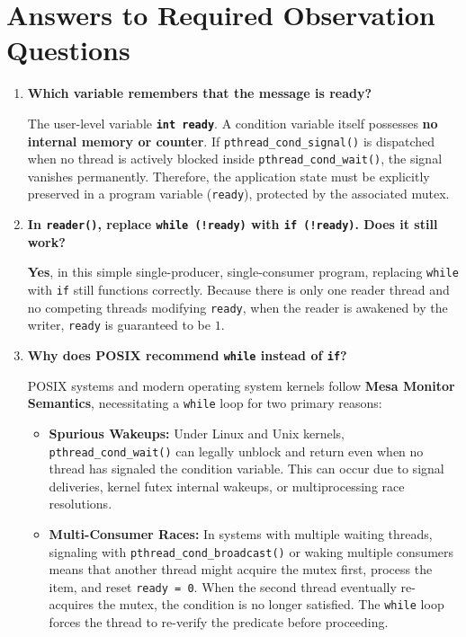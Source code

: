 \documentclass[12pt,a4paper]{report}
\numberwithin{equation}{chapter}
\numberwithin{figure}{chapter}
\numberwithin{table}{chapter}
\begin{document}
\section{Answers to Required Observation Questions}
\begin{enumerate}
    \item \textbf{Which variable remembers that the message is ready?}
    
    The user-level variable \textbf{\texttt{int ready}}.
    A condition variable itself possesses \textbf{no internal memory or counter}. If \texttt{pthread\_cond\_signal()} is dispatched when no thread is actively blocked inside \texttt{pthread\_cond\_wait()}, the signal vanishes permanently. Therefore, the application state must be explicitly preserved in a program variable (\texttt{ready}), protected by the associated mutex.

    \item \textbf{In \texttt{reader()}, replace \texttt{while (!ready)} with \texttt{if (!ready)}. Does it still work?}
    
    \textbf{Yes}, in this simple single-producer, single-consumer program, replacing \texttt{while} with \texttt{if} still functions correctly. Because there is only one reader thread and no competing threads modifying \texttt{ready}, when the reader is awakened by the writer, \texttt{ready} is guaranteed to be $1$.

    \item \textbf{Why does POSIX recommend \texttt{while} instead of \texttt{if}?}
    
    POSIX systems and modern operating system kernels follow \textbf{Mesa Monitor Semantics}, necessitating a \texttt{while} loop for two primary reasons:
    \begin{itemize}
        \item \textbf{Spurious Wakeups:} Under Linux and Unix kernels, \texttt{pthread\_cond\_wait()} can legally unblock and return even when no thread has signaled the condition variable. This can occur due to signal deliveries, kernel futex internal wakeups, or multiprocessing race resolutions.
        \item \textbf{Multi-Consumer Races:} In systems with multiple waiting threads, signaling with \texttt{pthread\_cond\_broadcast()} or waking multiple consumers means that another thread might acquire the mutex first, process the item, and reset \texttt{ready = 0}. When the second thread eventually re-acquires the mutex, the condition is no longer satisfied. The \texttt{while} loop forces the thread to re-verify the predicate before proceeding.
    \end{itemize}
\end{enumerate}
\end{document}
